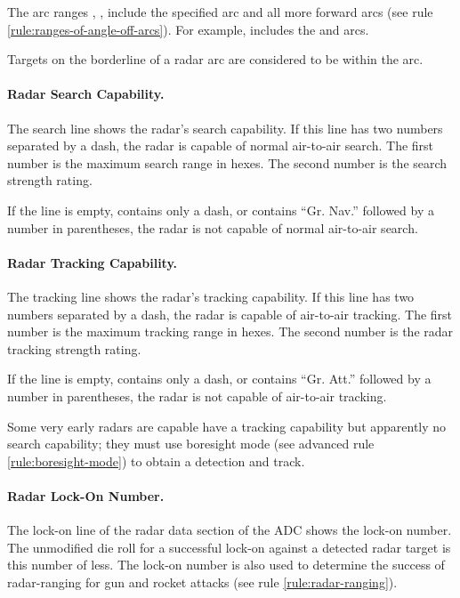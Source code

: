 {{The arc ranges , ,  include the specified arc and all more forward arcs (see rule \ref{rule:ranges-of-angle-off-arcs}). For example,  includes the  and  arcs.

Targets on the borderline of a radar arc are considered to be within the arc.

}

\paragraph{Radar Search Capability.} The search line shows the radar's search capability. If this line has two numbers separated by a dash, the radar is capable of normal air-to-air search. The first number is the maximum search range in hexes. The second number is the search strength rating. 

If the line is empty, contains only a dash, or contains “Gr. Nav.” followed by a number in parentheses, the radar is not capable of normal air-to-air search.

\paragraph{Radar Tracking Capability.} The tracking line shows the radar's tracking capability. If this line has two numbers separated by a dash, the radar is capable of air-to-air tracking. The first number is the maximum tracking range in hexes. The second number is the radar tracking strength rating. 

If the line is empty, contains only a dash, or contains “Gr. Att.” followed by a number in parentheses, the radar is not capable of air-to-air tracking.

Some very early radars are capable have a tracking capability but apparently no search capability; they must use boresight mode (see advanced rule \ref{rule:boresight-mode}) to obtain a detection and track.

\paragraph{Radar Lock-On Number.} The lock-on line of the radar data section of the ADC shows the lock-on number. The unmodified die roll for a successful lock-on against a detected radar target is this number of less. The lock-on number is also used to determine the success of radar-ranging for gun and rocket attacks (see rule \ref{rule:radar-ranging}). 

}
